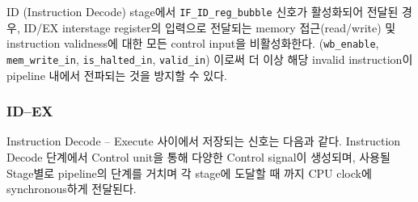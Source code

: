 \documentclass{scrartcl}
\begin{document}
ID (Instruction Decode) stage에서 \texttt{IF\_ID\_reg\_bubble} 신호가 활성화되어 전달된 경우, ID/EX interstage register의 입력으로 전달되는
memory 접근(read/write) 및 instruction validness에 대한 모든 control input을 비활성화한다. (\texttt{wb\_enable}, \texttt{mem\_write\_in}, \texttt{is\_halted\_in}, \texttt{valid\_in})
이로써 더 이상 해당 invalid instruction이 pipeline 내에서 전파되는 것을 방지할 수 있다.

\subsubsection{ID--EX}
Instruction Decode -- Execute 사이에서 저장되는 신호는 다음과 같다.
Instruction Decode 단계에서 Control unit을 통해 다양한 Control signal이 생성되며, 사용될 Stage별로 pipeline의 단계를 거치며
각 stage에 도달할 때 까지 CPU clock에 synchronous하게 전달된다.
\end{document}
